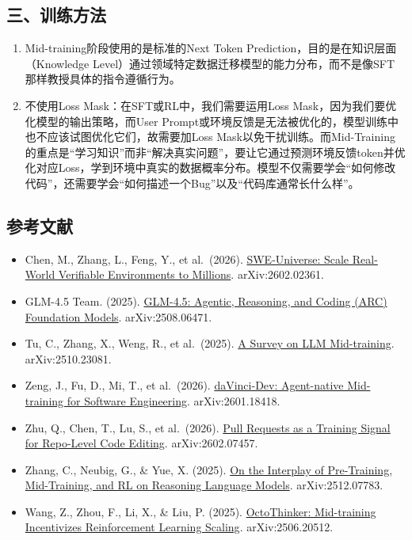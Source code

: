 \hypertarget{ux4e09ux8badux7ec3ux65b9ux6cd5}{%
\subsection{三、训练方法}\label{ux4e09ux8badux7ec3ux65b9ux6cd5}}

\begin{enumerate}
\def\labelenumi{\arabic{enumi}.}
\item
  Mid-training阶段使用的是标准的Next Token Prediction，目的是在知识层面（Knowledge Level）通过领域特定数据迁移模型的能力分布，而不是像SFT那样教授具体的指令遵循行为。
\item
  不使用Loss Mask：在SFT或RL中，我们需要运用Loss Mask，因为我们要优化模型的输出策略，而User Prompt或环境反馈是无法被优化的，模型训练中也不应该试图优化它们，故需要加Loss Mask以免干扰训练。而Mid-Training的重点是``学习知识''而非``解决真实问题''，要让它通过预测环境反馈token并优化对应Loss，学到环境中真实的数据概率分布。模型不仅需要学会``如何修改代码''，还需要学会``如何描述一个Bug''以及``代码库通常长什么样''。
\end{enumerate}

\hypertarget{ux53c2ux8003ux6587ux732e-117}{%
\subsection{参考文献}\label{ux53c2ux8003ux6587ux732e-117}}

\vspace{0.25em}
\begin{itemize}
\tightlist
\item
  Chen, M., Zhang, L., Feng, Y., et al.~(2026). \href{https://arxiv.org/abs/2602.02361}{SWE-Universe: Scale Real-World Verifiable Environments to Millions}. arXiv:2602.02361.
\item
  GLM-4.5 Team. (2025). \href{https://arxiv.org/abs/2508.06471}{GLM-4.5: Agentic, Reasoning, and Coding (ARC) Foundation Models}. arXiv:2508.06471.
\item
  Tu, C., Zhang, X., Weng, R., et al.~(2025). \href{https://arxiv.org/abs/2510.23081}{A Survey on LLM Mid-training}. arXiv:2510.23081.
\item
  Zeng, J., Fu, D., Mi, T., et al.~(2026). \href{https://arxiv.org/abs/2601.18418}{daVinci-Dev: Agent-native Mid-training for Software Engineering}. arXiv:2601.18418.
\item
  Zhu, Q., Chen, T., Lu, S., et al.~(2026). \href{https://arxiv.org/abs/2602.07457}{Pull Requests as a Training Signal for Repo-Level Code Editing}. arXiv:2602.07457.
\item
  Zhang, C., Neubig, G., \& Yue, X. (2025). \href{https://arxiv.org/abs/2512.07783}{On the Interplay of Pre-Training, Mid-Training, and RL on Reasoning Language Models}. arXiv:2512.07783.
\item
  Wang, Z., Zhou, F., Li, X., \& Liu, P. (2025). \href{https://arxiv.org/abs/2506.20512}{OctoThinker: Mid-training Incentivizes Reinforcement Learning Scaling}. arXiv:2506.20512.
\end{itemize}

